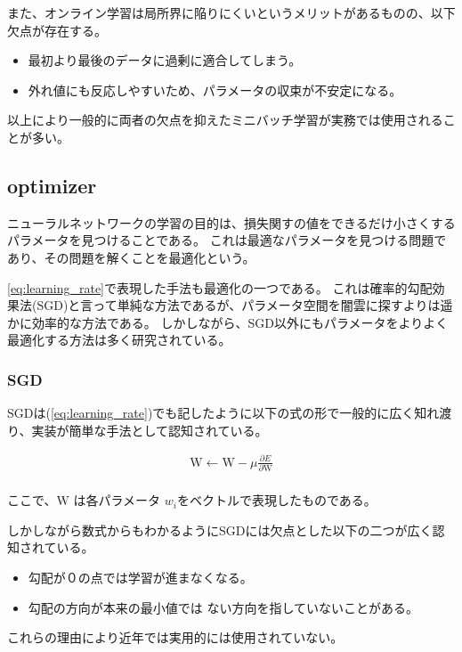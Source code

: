 また、オンライン学習は局所界に陥りにくいというメリットがあるものの、以下欠点が存在する。

\begin{itemize}
  \item 最初より最後のデータに過剰に適合してしまう。
  \item 外れ値にも反応しやすいため、パラメータの収束が不安定になる。
\end{itemize}

以上により一般的に両者の欠点を抑えたミニバッチ学習が実務では使用されることが多い。


\subsection{optimizer}
ニューラルネットワークの学習の目的は、損失関すの値をできるだけ小さくするパラメータを見つけることである。
これは最適なパラメータを見つける問題であり、その問題を解くことを最適化という。

\ref{eq:learning_rate}で表現した手法も最適化の一つである。
これは確率的勾配効果法(SGD)と言って単純な方法であるが、パラメータ空間を闇雲に探すよりは遥かに効率的な方法である。
しかしながら、SGD以外にもパラメータをよりよく最適化する方法は多く研究されている。

\subsubsection{SGD}
SGDは(\ref{eq:learning_rate})でも記したように以下の式の形で一般的に広く知れ渡り、実装が簡単な手法として認知されている。

\begin{eqnarray}
\mathrm{W} \leftarrow \mathrm{W} - \mu \frac{\partial E}{\partial \mathrm{W}} \\
\label{eq:norm uneq}
\end{eqnarray}

ここで、$ \mathrm{W} $ は各パラメータ $ w_i $をベクトルで表現したものである。

しかしながら数式からもわかるようにSGDには欠点とした以下の二つが広く認知されている。




\begin{itemize}
  \item 勾配が０の点では学習が進まなくなる。
  \item 勾配の方向が本来の最小値では ない方向を指していないことがある。
\end{itemize}
これらの理由により近年では実用的には使用されていない。

